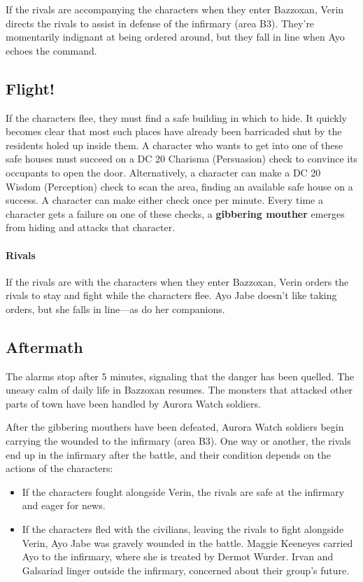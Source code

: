 \documentclass[letterpaper, 11pt, bg=full, twocolumn]{dndbook}
\begin{document}
If the rivals are accompanying the characters when they enter Bazzoxan, Verin directs the rivals to assist in defense of the infirmary (area B3). They're momentarily indignant at being ordered around, but they fall in line when Ayo echoes the command.

\subsection{Flight!}

If the characters flee, they must find a safe building in which to hide. It quickly becomes clear that most such places have already been barricaded shut by the residents holed up inside them. A character who wants to get into one of these safe houses must succeed on a DC 20 Charisma (Persuasion) check to convince its occupants to open the door. Alternatively, a character can make a DC 20 Wisdom (Perception) check to scan the area, finding an available safe house on a success. A character can make either check once per minute. Every time a character gets a failure on one of these checks, a \textbf{gibbering mouther} emerges from hiding and attacks that character.

\paragraph{Rivals}

If the rivals are with the characters when they enter Bazzoxan, Verin orders the rivals to stay and fight while the characters flee. Ayo Jabe doesn't like taking orders, but she falls in line---as do her companions.

\subsection{Aftermath}

The alarms stop after 5 minutes, signaling that the danger has been quelled. The uneasy calm of daily life in Bazzoxan resumes. The monsters that attacked other parts of town have been handled by Aurora Watch soldiers.

After the gibbering mouthers have been defeated, Aurora Watch soldiers begin carrying the wounded to the infirmary (area B3). One way or another, the rivals end up in the infirmary after the battle, and their condition depends on the actions of the characters:

\begin{itemize}
\item If the characters fought alongside Verin, the rivals are safe at the infirmary and eager for news.
\item If the characters fled with the civilians, leaving the rivals to fight alongside Verin, Ayo Jabe was gravely wounded in the battle. Maggie Keeneyes carried Ayo to the infirmary, where she is treated by Dermot Wurder. Irvan and Galsariad linger outside the infirmary, concerned about their group's future.
\end{itemize}
\end{document}
